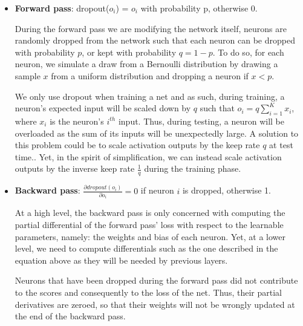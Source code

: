 \begin{itemize}[topsep=-10pt]
\item \textbf{Forward pass}: dropout($o_i$) = $o_i$ with probability p, otherwise 0.
  
During the forward pass we are modifying the network itself,
neurons are randomly dropped from the network such that each neuron can be dropped with probability $p$,
or kept with probability $q = 1- p$.
To do so, for each neuron, we simulate a draw from a Bernoulli distribution by drawing a sample $x$ from a uniform distribution
and dropping a neuron if $x < p$.

We only use dropout when training a net and as such, during training, a neuron's expected input will be scaled down by $q$ such that $o_i = q\sum_{i=1}^K x_i$, where $x_i$ is the neuron's $i^{th}$ input.
Thus, during testing, a neuron will be overloaded as the sum of its inputs will be unexpectedly large.
A solution to this problem could be to scale activation outputs by the keep rate $q$ at test time..
Yet, in the spirit of simplification,
we can instead scale activation outputs by the inverse keep rate $\frac{1}{q}$ during the training phase.


\item \textbf{Backward pass}: $\frac{\partial dropout(o_i)}{\partial o_i} = 0 $ if neuron $i$ is dropped, otherwise 1.

  At a high level, the backward pass is only concerned with computing the partial differential of the forward pass' loss with respect to the
  learnable parameters, namely: the weights and bias of each neuron.
  Yet, at a lower level, we need to compute differentials such as the one described in the equation above as they will be needed
  by previous layers.

  Neurons that have been dropped during the forward pass did not contribute to the scores and consequently to the loss of the net.
  Thus, their partial derivatives are zeroed, so that their weights will not be wrongly updated at the end of the backward pass.
\end{itemize}



